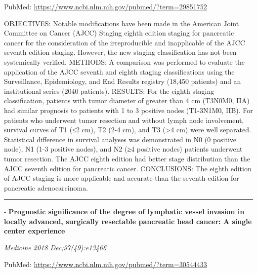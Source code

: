 \documentclass[]{article}
\begin{document}
PubMed: \url{https://www.ncbi.nlm.nih.gov/pubmed/?term=29851752}

OBJECTIVES: Notable modifications have been made in the American Joint
Committee on Cancer (AJCC) Staging eighth edition staging for pancreatic
cancer for the consideration of the irreproducible and inapplicable of
the AJCC seventh edition staging. However, the new staging
classification has not been systemically verified. METHODS: A comparison
was performed to evaluate the application of the AJCC seventh and eighth
staging classifications using the Surveillance, Epidemiology, and End
Results registry (18,450 patients) and an institutional series (2040
patients). RESULTS: For the eighth staging classification, patients with
tumor diameter of greater than 4 cm (T3N0M0, IIA) had similar prognosis
to patients with 1 to 3 positive nodes (T1-3N1M0, IIB). For patients who
underwent tumor resection and without lymph node involvement, survival
curves of T1 (≤2 cm), T2 (2-4 cm), and T3 (\textgreater{}4 cm) were well
separated. Statistical difference in survival analyses was demonstrated
in N0 (0 positive node), N1 (1-3 positive nodes), and N2 (≥4 positive
nodes) patients underwent tumor resection. The AJCC eighth edition had
better stage distribution than the AJCC seventh edition for pancreatic
cancer. CONCLUSIONS: The eighth edition of AJCC staging is more
applicable and accurate than the seventh edition for pancreatic
adenocarcinoma.

{}

{}

\begin{center}\rule{0.5\linewidth}{\linethickness}\end{center}

 - \textbf{Prognostic significance of the degree of lymphatic vessel
invasion in locally advanced, surgically resectable pancreatic head
cancer: A single center experience}

\emph{Medicine 2018 Dec;97(49):e13466}

PubMed: \url{https://www.ncbi.nlm.nih.gov/pubmed/?term=30544433}
\end{document}
